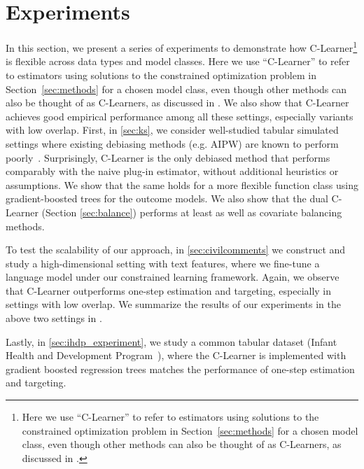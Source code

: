 \section{Experiments}
\label{sec:experiments}

In this section, we present a series of experiments to demonstrate how C-Learner\ifdefined\msom\else\footnote{Here we use ``C-Learner'' to refer to estimators using solutions to the constrained optimization problem in Section~\ref{sec:methods} for a chosen model class, even though other methods can also be thought of as C-Learners, as discussed in .} \fi
is flexible across data types and model classes. \ifdefined\msom Here we use ``C-Learner'' to refer to estimators using solutions to the constrained optimization problem in Section~\ref{sec:methods} for a chosen model class, even though other methods can also be thought of as C-Learners, as discussed in .\fi
We also show that C-Learner achieves good empirical performance among all these settings, especially variants with low overlap.
First, in \cref{sec:ks}, we consider well-studied tabular simulated settings where existing debiasing methods (e.g. AIPW) are known to perform poorly~\cite{KangSc07, robins2007comment}. 
Surprisingly, C-Learner is the only debiased method that performs comparably with the naive plug-in estimator, without additional heuristics or assumptions. 
We show that the same holds for a more flexible function class using gradient-boosted trees for the outcome models. We also show that the dual C-Learner (Section \ref{sec:balance}) performs at least as well as covariate balancing methods.

To test the scalability of our approach, in \cref{sec:civilcomments} we construct and study a high-dimensional setting with text features, where we 
fine-tune a language model \citep{distilbert} under our constrained learning framework. Again, we observe that C-Learner outperforms one-step estimation and targeting, especially in settings with low overlap. We summarize the results of our experiments in the above two settings in .




\ifdefined\msom\else Lastly, in \cref{sec:ihdp_experiment}, we study a common tabular dataset 
(Infant Health and Development Program~\cite{brooks1992effects}), where the C-Learner is implemented with gradient boosted regression trees matches the performance of one-step estimation and targeting. 
\fi

